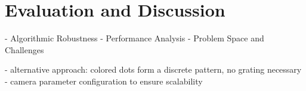\documentclass[thesis.tex]{subfiles}
\begin{document}
\chapter{Evaluation and Discussion}
\label{chapter:evaluation-discussion}

- Algorithmic Robustness
- Performance Analysis
- Problem Space and Challenges


- alternative approach: colored dots form a discrete pattern, no grating necessary
- camera parameter configuration to ensure scalability
\end{document}
